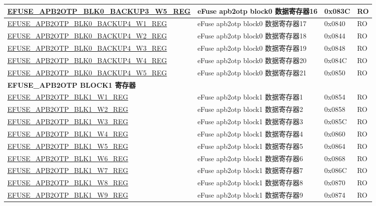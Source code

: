 \begin{longtable}{ | p{7cm} | p{6cm} | p{1.2cm} | p{1.5cm} | }
\hyperref[regdesc:EFUSEAPB2OTPBLK0BACKUP3WNREG]{EFUSE\_APB2OTP\_BLK0\_BACKUP3\_W5\_REG} & eFuse apb2otp block0 数据寄存器16 & 0x083C & RO \\\hline
\hyperref[regdesc:EFUSEAPB2OTPBLK0BACKUP4WNREG]{EFUSE\_APB2OTP\_BLK0\_BACKUP4\_W1\_REG} & eFuse apb2otp block0 数据寄存器17 & 0x0840 & RO \\\hline
\hyperref[regdesc:EFUSEAPB2OTPBLK0BACKUP4WNREG]{EFUSE\_APB2OTP\_BLK0\_BACKUP4\_W2\_REG} & eFuse apb2otp block0 数据寄存器18 & 0x0844 & RO \\\hline
\hyperref[regdesc:EFUSEAPB2OTPBLK0BACKUP4WNREG]{EFUSE\_APB2OTP\_BLK0\_BACKUP4\_W3\_REG} & eFuse apb2otp block0 数据寄存器19 & 0x0848 & RO \\\hline
\hyperref[regdesc:EFUSEAPB2OTPBLK0BACKUP4WNREG]{EFUSE\_APB2OTP\_BLK0\_BACKUP4\_W4\_REG} & eFuse apb2otp block0 数据寄存器20 & 0x084C & RO \\\hline
\hyperref[regdesc:EFUSEAPB2OTPBLK0BACKUP4WNREG]{EFUSE\_APB2OTP\_BLK0\_BACKUP4\_W5\_REG} & eFuse apb2otp block0 数据寄存器21 & 0x0850 & RO \\\hline

\multicolumn{4}{|l|}{\textbf{EFUSE\_APB2OTP BLOCK1 寄存器}} \\ \hline
\hyperref[regdesc:EFUSEAPB2OTPBLK1WNREG]{EFUSE\_APB2OTP\_BLK1\_W1\_REG} & eFuse apb2otp block1 数据寄存器1 & 0x0854 & RO \\\hline
\hyperref[regdesc:EFUSEAPB2OTPBLK1WNREG]{EFUSE\_APB2OTP\_BLK1\_W2\_REG} & eFuse apb2otp block1 数据寄存器2 & 0x0858 & RO \\\hline
\hyperref[regdesc:EFUSEAPB2OTPBLK1WNREG]{EFUSE\_APB2OTP\_BLK1\_W3\_REG} & eFuse apb2otp block1 数据寄存器3 & 0x085C & RO \\\hline
\hyperref[regdesc:EFUSEAPB2OTPBLK1WNREG]{EFUSE\_APB2OTP\_BLK1\_W4\_REG} & eFuse apb2otp block1 数据寄存器4 & 0x0860 & RO \\\hline
\hyperref[regdesc:EFUSEAPB2OTPBLK1WNREG]{EFUSE\_APB2OTP\_BLK1\_W5\_REG} & eFuse apb2otp block1 数据寄存器5 & 0x0864 & RO \\\hline
\hyperref[regdesc:EFUSEAPB2OTPBLK1WNREG]{EFUSE\_APB2OTP\_BLK1\_W6\_REG} & eFuse apb2otp block1 数据寄存器6 & 0x0868 & RO \\\hline
\hyperref[regdesc:EFUSEAPB2OTPBLK1WNREG]{EFUSE\_APB2OTP\_BLK1\_W7\_REG} & eFuse apb2otp block1 数据寄存器7 & 0x086C & RO \\\hline
\hyperref[regdesc:EFUSEAPB2OTPBLK1WNREG]{EFUSE\_APB2OTP\_BLK1\_W8\_REG} & eFuse apb2otp block1 数据寄存器8 & 0x0870 & RO \\\hline
\hyperref[regdesc:EFUSEAPB2OTPBLK1WNREG]{EFUSE\_APB2OTP\_BLK1\_W9\_REG} & eFuse apb2otp block1 数据寄存器9 & 0x0874 & RO \\\hline


\end{longtable}
